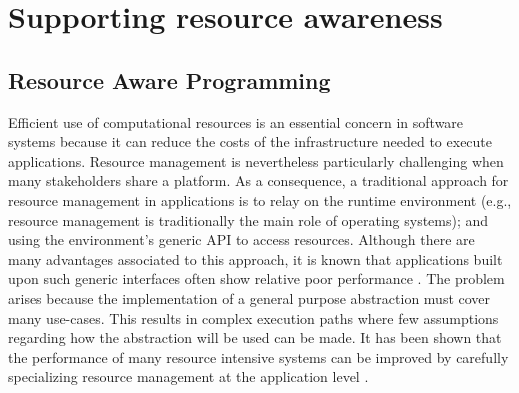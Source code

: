 \chapter{Supporting resource awareness}
\label{chp:background_resource_awareness}


\section{Resource Aware Programming} \label{sec:resource-awareness}

Efficient use of computational resources is an essential concern in software systems because it can reduce the costs of the infrastructure needed to execute applications.
Resource management is nevertheless particularly challenging when many stakeholders share a platform.
As a consequence, a traditional approach for resource management in applications is to relay on the runtime environment (e.g., resource management is traditionally the main role of operating systems); and using the environment's generic API to access resources.
Although there are many advantages associated to this approach, it is known that applications built upon such generic interfaces often show relative poor performance \cite{engler1995exokernel}.
The problem arises because the implementation of a general purpose abstraction must cover many use-cases.
This results in complex execution paths where few assumptions regarding how the abstraction will be used can be made.
It has been shown that the performance of many resource intensive systems can be improved by carefully specializing resource management at the application level \cite{engler1995exokernel,Belay:2014:IPD:2685048.2685053,Marinos:2014:NSS:2619239.2626311}.

